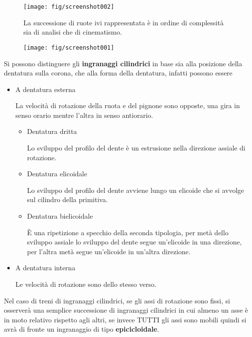 \documentclass[a4paper, 15pt]{article}
\begin{document}
\begin{adjustwidth}{2in}{}
	\begin{figure}[H]
		\centering
		\texttt{[image: fig/screenshot002]}
		\caption{La successione di ruote ivi rappresentata è in ordine di complessità sia di analisi che di cinematismo.}
		\label{fig:screenshot002}
	\end{figure}
	
\newpage
	
	\begin{figure}[H]
		\centering
		\texttt{[image: fig/screenshot001]}
		\label{fig:screenshot001}
	\end{figure}
	
	Si possono distinguere gli \textbf{ingranaggi cilindrici} in base sia alla posizione della dentatura sulla corona, che alla forma della dentatura, infatti possono essere
	\begin{itemize}
		\item A dentatura esterna
		
		La velocità di rotazione della ruota e del pignone sono opposte, una gira in senso orario mentre l'altra in senso antiorario.
		\begin{itemize}
			\item Dentatura dritta
			
			Lo sviluppo del profilo del dente è un estrusione nella direzione assiale di rotazione.
			
			\item Dentatura elicoidale 
			
			Lo sviluppo del profilo del dente avviene lungo un elicoide che si avvolge sul cilindro della primitiva.
			
			\item Dentatura bielicoidale
			
			È una ripetizione a specchio della seconda tipologia, per metà dello sviluppo assiale lo sviluppo del dente segue un'elicoide in una direzione, per l'altra metà segue un'elicoide in un'altra direzione.
		\end{itemize}
		\item A dentatura interna
		
		Le velocità di rotazione sono dello stesso verso.
	\end{itemize}

	Nel caso di treni di ingranaggi cilindrici, se gli assi di rotazione sono fissi, si osserverà una semplice successione di ingranaggi cilindrici in cui almeno un asse è in moto relativo rispetto agli altri, se invece TUTTI gli assi sono mobili quindi si avrà di fronte un ingranaggio di tipo \textbf{epicicloidale}.
	

\end{adjustwidth}
\end{document}
